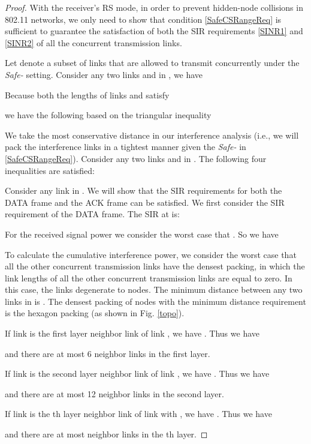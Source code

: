 \documentclass[conference]{IEEEtran}
\begin{document}
\begin{proof}
With the receiver's RS mode, in order to prevent hidden-node
collisions in 802.11 networks, we only need to show that condition
\eqref{SafeCSRangeReq} is suff\/icient to guarantee the satisfaction
of both the SIR requirements \eqref{SINR1} and \eqref{SINR2} of all
the concurrent transmission links.

Let  denote a subset of links that are allowed to
transmit concurrently under the
\emph{Safe-} setting. Consider any two
links  and  in , we have

Because both the lengths of links  and  satisfy

we have the following based on the triangular inequality


We take the most conservative distance  in our
interference analysis (i.e., we will pack the interference links in
a tightest manner given the
\emph{Safe-} in
\eqref{SafeCSRangeReq}). Consider any two links  and  in
. The following four inequalities are
satisf\/ied:


Consider any link  in . We will show that
the SIR requirements for both the DATA frame and the ACK frame can
be satisf\/ied. We f\/irst consider the SIR requirement of the DATA
frame. The SIR at  is:


For the received signal power we consider the worst case that
.  So we have



To calculate the cumulative interference power, we consider the
worst case that all the other concurrent transmission links have the
densest packing, in which the link lengths of all the other
concurrent transmission links are equal to zero. In this case, the
links degenerate to nodes. The minimum distance between any two
links in  is . The densest packing of
nodes with the minimum distance requirement is the hexagon packing
(as shown in Fig. \ref{topo}).

If link  is the f\/irst layer neighbor link of link , we
have . Thus we have

and there are at most 6 neighbor links in the f\/irst layer.

If link  is the second layer neighbor link of link , we
have . Thus we have

and there are at most 12 neighbor links in the second layer.

If link  is the th layer neighbor link of link  with
, we have . Thus we have

and there are at most  neighbor links in the th layer.


\end{proof}
\end{document}
